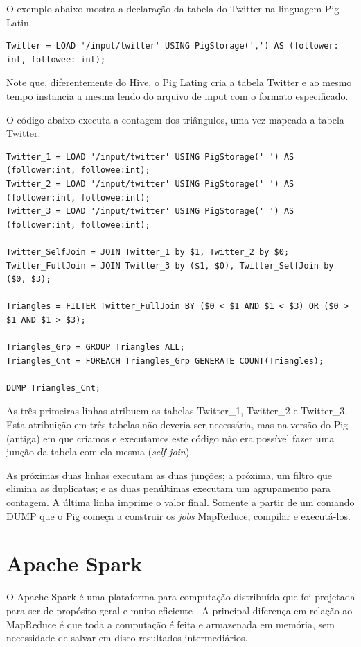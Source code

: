 O exemplo abaixo mostra a declaração da tabela do Twitter na linguagem Pig Latin.

\begin{verbatim}
Twitter = LOAD '/input/twitter' USING PigStorage(',') AS (follower: int, followee: int);
\end{verbatim}

Note que, diferentemente do Hive, o Pig Lating cria a tabela Twitter e ao mesmo tempo instancia 
a mesma lendo do arquivo de input com o formato especificado.

O código abaixo executa a contagem dos triângulos, uma vez mapeada a tabela Twitter.

\begin{verbatim}
Twitter_1 = LOAD '/input/twitter' USING PigStorage(' ') AS (follower:int, followee:int);
Twitter_2 = LOAD '/input/twitter' USING PigStorage(' ') AS (follower:int, followee:int);
Twitter_3 = LOAD '/input/twitter' USING PigStorage(' ') AS (follower:int, followee:int);

Twitter_SelfJoin = JOIN Twitter_1 by $1, Twitter_2 by $0;
Twitter_FullJoin = JOIN Twitter_3 by ($1, $0), Twitter_SelfJoin by ($0, $3);

Triangles = FILTER Twitter_FullJoin BY ($0 < $1 AND $1 < $3) OR ($0 > $1 AND $1 > $3);

Triangles_Grp = GROUP Triangles ALL;
Triangles_Cnt = FOREACH Triangles_Grp GENERATE COUNT(Triangles);

DUMP Triangles_Cnt;
\end{verbatim}

As três primeiras linhas atribuem as tabelas Twitter\_1, Twitter\_2 e Twitter\_3. Esta atribuição 
em três tabelas não deveria ser necessária, mas na versão do Pig (antiga) em que criamos e executamos
este código não era possível fazer uma junção da tabela com ela mesma (\emph{self join}).

As próximas duas linhas executam as duas junções; a próxima, um filtro que elimina as duplicatas;
e as duas penúltimas executam um agrupamento para contagem. A última linha imprime o valor final.
Somente a partir de um comando DUMP que o Pig começa a construir os \textit{jobs} MapReduce, compilar
e executá-los.

\section{Apache Spark}
O Apache Spark é uma plataforma para computação distribuída que foi projetada para ser de propósito geral e muito eficiente \cite{karau2015learning}. A principal diferença em relação ao MapReduce é que toda a computação é feita e armazenada em memória, sem necessidade de salvar em disco resultados intermediários. 

